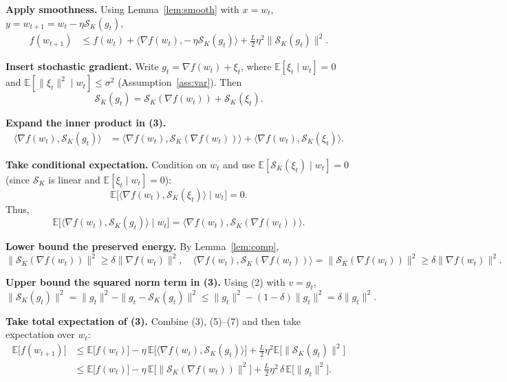 \documentclass{article}
\newcommand{\E}{\mathbb{E}}
\newcommand{\cK}{\mathcal{S}_K}
\begin{document}
\begin{enumerate}[label={[\textbf{Step \arabic*}]}]
\item \textbf{Apply smoothness.}  
Using Lemma~\ref{lem:smooth} with $x=w_t$, $y=w_{t+1}=w_t-\eta\cK(g_t)$,
\begin{align}
f(w_{t+1})
&\le f(w_t)+\langle\nabla f(w_t),-\,\eta\cK(g_t)\rangle
     +\frac{L}{2}\eta^{2}\|\cK(g_t)\|^{2}. \tag{3}
\end{align}

\item \textbf{Insert stochastic gradient.}  
Write $g_t=\nabla f(w_t)+\xi_t$, where $\E[\xi_t\mid w_t]=0$ and $\E[\|\xi_t\|^{2}\mid w_t]\le\sigma^{2}$ (Assumption~\ref{ass:var}). Then
\[
\cK(g_t)=\cK(\nabla f(w_t))+\cK(\xi_t).
\]

\item \textbf{Expand the inner product in (3).}
\begin{align}
\langle\nabla f(w_t),\cK(g_t)\rangle
&=\langle\nabla f(w_t),\cK(\nabla f(w_t))\rangle
  +\langle\nabla f(w_t),\cK(\xi_t)\rangle. \tag{4}
\end{align}

\item \textbf{Take conditional expectation.}  
Condition on $w_t$ and use $\E[\cK(\xi_t)\mid w_t]=0$ (since $\cK$ is linear and $\E[\xi_t\mid w_t]=0$):
\[
\E\!\big[\langle\nabla f(w_t),\cK(\xi_t)\rangle\mid w_t\big]=0.
\]
Thus,
\[
\E\!\big[\langle\nabla f(w_t),\cK(g_t)\rangle\mid w_t\big]
= \langle\nabla f(w_t),\cK(\nabla f(w_t))\rangle. \tag{5}
\]

\item \textbf{Lower bound the preserved energy.}  
By Lemma~\ref{lem:comp},
\[
\|\cK(\nabla f(w_t))\|^{2}\ge\delta\|\nabla f(w_t)\|^{2},
\quad
\langle\nabla f(w_t),\cK(\nabla f(w_t))\rangle
= \|\cK(\nabla f(w_t))\|^{2}
\ge\delta\|\nabla f(w_t)\|^{2}. \tag{6}
\]

\item \textbf{Upper bound the squared norm term in (3).}  
Using (2) with $v=g_t$,
\[
\|\cK(g_t)\|^{2}= \|g_t\|^{2}-\|g_t-\cK(g_t)\|^{2}
\le \|g_t\|^{2}-(1-\delta)\|g_t\|^{2}
= \delta\|g_t\|^{2}. \tag{7}
\]

\item \textbf{Take total expectation of (3).}  
Combine (3), (5)–(7) and then take expectation over $w_t$:
\begin{align}
\E\big[f(w_{t+1})\big]
&\le \E\big[f(w_t)\big]
   -\eta\,\E\!\big[\langle\nabla f(w_t),\cK(g_t)\rangle\big]
   +\frac{L}{2}\eta^{2}\E\!\big[\|\cK(g_t)\|^{2}\big] \nonumber\\
&\le \E\big[f(w_t)\big]
   -\eta\,\E\!\big[\|\cK(\nabla f(w_t))\|^{2}\big]
   +\frac{L}{2}\eta^{2}\,\delta\,\E\!\big[\|g_t\|^{2}\big]. \tag{8}
\end{align}


\end{enumerate}
\end{document}
